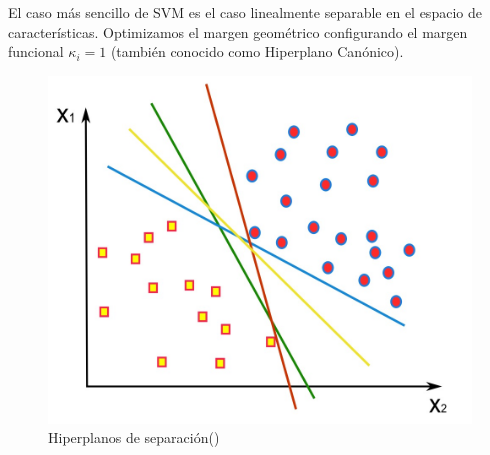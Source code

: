 El caso más sencillo de SVM es el caso linealmente separable en el espacio de características. Optimizamos el margen geométrico configurando el margen funcional $\kappa_i = 1$ (también conocido como Hiperplano Canónico).


\begin{figure}[H]
	\begin{center}
		\includegraphics[width=1\textwidth]{2/figures/svm1.jpeg}
		\caption{Hiperplanos de separación(\cite{tecnica3})}
	\end{center}
\end{figure}

